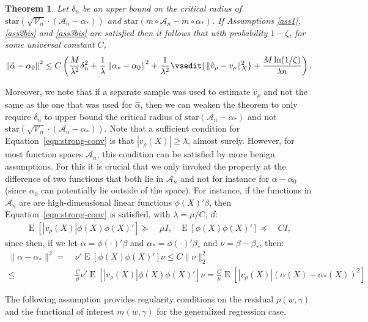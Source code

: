 \documentclass[aos]{imsart}
\numberwithin{equation}{section}
\theoremstyle{plain}
\newtheorem{theorem}{Theorem}[section]
\theoremstyle{remark}
\newcommand{\C}[1]{\mathcal{#1}}
\DeclareMathOperator{\E}{E}
\begin{document}
\begin{theorem}\label{thm1vunknown}
Let $\delta_{n}$ be an upper bound on the critical radius of $\mathrm{star}(\sqrt{\mathcal{V}_n}\cdot (\mathcal{A}_n-\alpha_{*}))$ and $\mathrm{star}(m\circ \mathcal{A}_n-m\circ\alpha_{*})$. If Assumptions \ref{ass1}, \ref{ass2bis} and \ref{ass3bis} are
satisfied then it follows that with probability $1-\zeta$, for some universal constant $C$,
\[
\left\Vert \hat{\alpha}-\alpha_{0}\right\Vert ^{2}\leq C\left(\frac{M}{\lambda^2}\delta_{n}%
^{2}+ \frac{1}{\lambda} \left\Vert \alpha_{\ast}-\alpha_{0}\right\Vert ^{2} + \frac{1}{\lambda^2} \vsedit{\|\hat{v}_\rho - v_\rho\|_X^2} + \frac{M\ln(1/\zeta
)}{\lambda n}\right).
\]
\end{theorem}
Moreover, we note that if a separate sample was used to estimate $\hat{v}_{\rho}$ and not the same as the one that was used for $\hat{\alpha}$, then we can weaken the theorem to only require $\delta_n$ to upper bound the critical radius of $\mathrm{star}(\mathcal{A}_n-\alpha_{*})$ and not $\mathrm{star}(\sqrt{\mathcal{V}_n}\cdot (\mathcal{A}_n-\alpha_{*}))$. Note that a sufficient condition for Equation~\eqref{eqn:strong-conv} is that $|v_\rho(X)|\geq \lambda$, almost surely. However, for most function spaces $\C{A}_n$, this condition can be satisfied by more benign assumptions. For this it is crucial that we only invoked the property at the difference of two functions that both lie in $\C{A}_n$ and not for instance for $\alpha - \alpha_0$ (since $\alpha_0$ can potentially lie outside of the space). For instance, if the functions in $\C{A}_n$ are are high-dimensional linear functions $\phi(X)'\beta$, then Equation~\eqref{eqn:strong-conv} is satisfied, with $\lambda = \mu/C$, if:
\begin{align*}
    \E[|v_\rho(X)|\phi(X)\phi(X)'] \succeq~& \mu I, &
    \E[\phi(X)\phi(X)'] \preceq~& C I,
\end{align*}
since then, if we let $\alpha=\phi(\cdot)'\beta$ and $\alpha_{\ast}=\phi(\cdot)'\beta_{\ast}$ and $\nu=\beta - \beta_{\ast}$, then:
\begin{align*}
    \|\alpha - \alpha_{\ast}\|^2 =~& \nu' \E[\phi(X)\phi(X)']\nu \leq C \|\nu\|_2^2\\
    \leq~& \frac{C}{\mu} \nu'\E[|v_\rho(X)| \phi(X)\phi(X)']\nu = \frac{C}{\mu}\E[|v_\rho(X)| (\alpha(X)-\alpha_{\ast}(X))^2] 
\end{align*}

The following assumption provides regularity conditions on the residual $\rho(w, \gamma)$ and the functional of interest $m(w, \gamma)$ for the generalized regression case.
\end{document}
